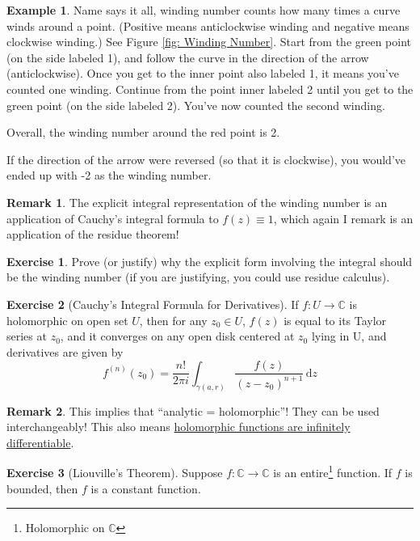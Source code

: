 \documentclass[a4paper, 12pt]{article}
\theoremstyle{definition}
\newtheorem{exercise}{Exercise}
\newtheorem{example}{Example}
\newtheorem{remark}{Remark}
\numberwithin{theorem}{section}
\numberwithin{definition}{section}
\numberwithin{exercise}{section}
\numberwithin{remark}{section}
\numberwithin{figure}{section}
\numberwithin{example}{section}
\newcommand{\C}{\mathbb{C}}
\newcommand{\intd}{\,\text{d}}
\begin{document}
\begin{example}
    Name says it all, winding number counts how many times a curve winds around a point.
    (Positive means anticlockwise winding and negative means clockwise winding.)
    See Figure \ref{fig: Winding Number}.
    Start from the green point (on the side labeled 1), and follow the curve in the direction of the arrow (anticlockwise).
    Once you get to the inner point also labeled 1, it means you've counted one winding.
    Continue from the point inner labeled 2 until you get to the green point (on the side labeled 2).
    You've now counted the second winding.

    Overall, the winding number around the red point is 2.

    If the direction of the arrow were reversed (so that it is clockwise),
    you would've ended up with -2 as the winding number.
\end{example}
\begin{remark}
    The explicit integral representation of the winding number is an application of Cauchy's integral formula to $f(z) \equiv 1$,
    which again I remark is an application of the residue theorem!
\end{remark}
\begin{exercise}
    Prove (or justify) why the explicit form involving the integral should be the winding number (if you are justifying, you could use residue calculus).
\end{exercise}
\begin{exercise}[Cauchy's Integral Formula for Derivatives]
    If $f:U \rightarrow \C$ is holomorphic on open set $U$, then for any $z_0 \in U$,
    $f(z)$ is equal to its Taylor series at $z_0$, and it converges on any open disk
    centered at $z_0$ lying in U,
    and derivatives are given by
    \begin{equation*}
        f^{(n)} (z_0) = \frac{n!}{2\pi i} \int_{\gamma (a,r)} \frac{f(z)}{(z-z_0)^{n+1}} \intd z
    \end{equation*}
\end{exercise}
\begin{remark}
    This implies that ``analytic = holomorphic''!
    They can be used interchangeably!
    This also means \ul{holomorphic functions are infinitely differentiable}.
\end{remark}
\begin{exercise}[Liouville's Theorem]
    Suppose $f:\C \rightarrow \C$ is an entire\footnote{Holomorphic on $\C$} function.
    If $f$ is bounded, then $f$ is a constant function.
\end{exercise}
\end{document}

